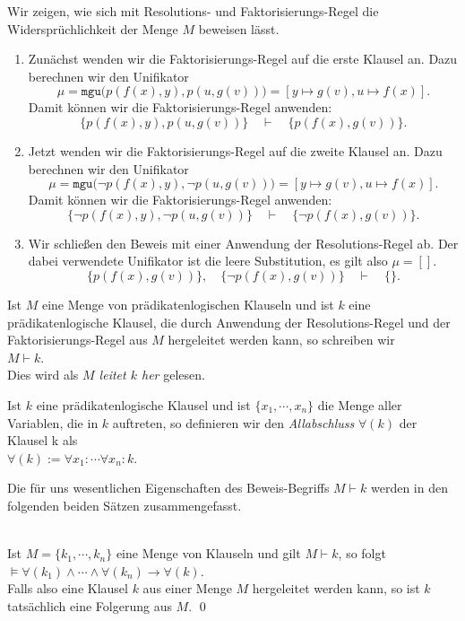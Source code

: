\noindent
Wir zeigen, wie sich mit Resolutions- und Faktorisierungs-Regel die Widerspr\"{u}chlichkeit
der Menge $M$ beweisen l\"{a}sst.
\begin{enumerate}
\item Zun\"{a}chst wenden wir die Faktorisierungs-Regel auf die erste Klausel an. 
      Dazu berechnen wir den Unifikator 
      \[ \mu = \mathtt{mgu}\bigl(p(f(x),y), p(u,g(v))\bigr) = [y \mapsto g(v), u \mapsto f(x)]. \]
      Damit k\"{o}nnen wir die Faktorisierungs-Regel anwenden: 
      \[ \bigl\{p(f(x),y), p(u,g(v))\bigr\} \quad \vdash \quad \bigl\{p(f(x),g(v))\bigr\}. \]
\item Jetzt wenden wir die Faktorisierungs-Regel auf die zweite Klausel an.
      Dazu berechnen wir  den Unifikator 
      \[ \mu = \mathtt{mgu}\bigl(\neg p(f(x),y), \neg p(u,g(v))\bigr) = [y \mapsto g(v), u \mapsto f(x)]. 
      \]
      Damit k\"{o}nnen wir die Faktorisierungs-Regel anwenden: 
      \[ \bigl\{ \neg p(f(x),y), \neg p(u,g(v))\bigr\} \quad \vdash \quad \bigl\{\neg p(f(x),g(v))\bigr\}.
      \]
\item Wir schlie\ss{}en den Beweis mit einer Anwendung der Resolutions-Regel ab.
      Der dabei verwendete Unifikator ist die leere Substitution, es gilt also $\mu = []$.      
      \[ \bigl\{p(f(x),g(v))\bigr\}, \quad \bigl\{\neg p(f(x),g(v))\bigr\} \quad \vdash \quad \{\}. \]
\end{enumerate}
Ist $M$ eine Menge von pr\"{a}dikatenlogischen Klauseln und ist $k$ eine pr\"{a}dikatenlogische
Klausel, die durch Anwendung der Resolutions-Regel und der Faktorisierungs-Regel aus $M$
hergeleitet werden kann, so schreiben wir \\[0.2cm]
\hspace*{1.3cm} $M \vdash k$.
\\[0.2cm]
Dies wird als \emph{\color{blue}$M$ leitet $k$ her} gelesen.

\begin{Definition}[Allabschluss]
  Ist $k$ eine pr\"{a}dikatenlogische Klausel und ist $\{x_1,\cdots,x_n\}$
  die Menge aller Variablen, die in $k$ auftreten, so definieren wir
  den {\emph{\color{blue}Allabschluss}}  $\forall(k)$  der Klausel k als \\[0.2cm]
  \hspace*{1.3cm} $\forall(k) := \forall x_1\colon \cdots \forall x_n \colon k$. \eox
\end{Definition}

\noindent
Die f\"{u}r uns wesentlichen Eigenschaften des Beweis-Begriffs $M \vdash k$ werden in den folgenden
beiden S\"{a}tzen zusammengefasst.
\begin{Satz} \hspace*{\fill} \\
    Ist $M = \{k_1,\cdots,k_n\}$ eine Menge von Klauseln und gilt $M \vdash k$, so folgt \\[0.2cm]
    \hspace*{1.3cm} $\models \forall(k_1) \wedge \cdots \wedge \forall(k_n) \rightarrow \forall(k)$. \\[0.2cm]
    Falls also eine Klausel $k$ aus einer Menge $M$ hergeleitet werden kann,
    so ist $k$ tats\"{a}chlich eine Folgerung aus $M$. \qed
\end{Satz}

